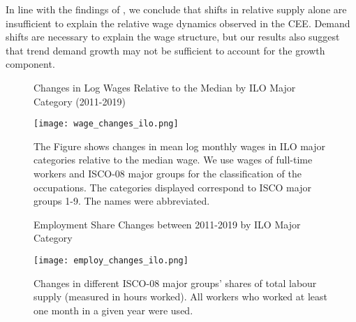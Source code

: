 \documentclass[11pt]{article}
\begin{document}
In line with the findings of \citeauthor{katz1992changes}, we conclude that shifts in relative supply alone are insufficient to explain the relative wage dynamics observed in the CEE. Demand shifts are necessary to explain the wage structure, but our results also suggest that trend demand growth may not be sufficient to account for the growth component.




\begin{figure}[!htbp]%
\centering
    \caption{Changes in Log Wages Relative to the Median by ILO Major Category (2011-2019)}
    {\texttt{[image: wage\_changes\_ilo.png]} }
    \caption*{\footnotesize The Figure shows changes in mean log monthly wages in ILO major categories relative to the median wage. We use wages of full-time workers and ISCO-08 major groups for the classification of the occupations. The categories displayed correspond to ISCO major groups 1-9. The names were abbreviated.}
\label{wage_changes_ilo}
\end{figure}


\begin{figure}[!htbp]%
\centering
    \caption{Employment Share Changes between 2011-2019 by ILO Major Category}
    {\texttt{[image: employ\_changes\_ilo.png]} }
    \caption*{\footnotesize Changes in different ISCO-08 major groups' shares of total labour supply (measured in hours worked). All workers who worked at least one month in a given year were used.}
\label{employ_changes_ilo}
\end{figure}


\end{document}
